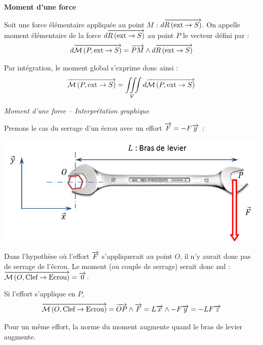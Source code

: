 \documentclass[10pt]{article}
\begin{document}
\begin{defi}
\textbf{Moment d'une force}

Soit une force élémentaire appliquée au point $M$ : $d\overrightarrow{R\left( {\text{ext}} \rightarrow {S}\right)}$. On appelle moment élémentaire de la force $d\overrightarrow{R\left( {\text{ext}} \rightarrow {S}\right)}$ au point $P$ le vecteur défini par : 
$$
d\overrightarrow{\mathcal{M}\left( {P}, {\text{ext}} \rightarrow {S}\right)} = \overrightarrow{PM}\wedge d\overrightarrow{R\left( {\text{ext}} \rightarrow {S}\right)}
$$

Par intégration, le moment global s'exprime donc ainsi : 
$$
\overrightarrow{\mathcal{M}\left( {P}, {\text{ext}} \rightarrow {S}\right)} = \iiint\limits_{\mathcal{V}}d\overrightarrow{\mathcal{M}\left( {P}, {\text{ext}} \rightarrow {S}\right)} 
$$


\end{defi}




\begin{rem}
\textit{Moment d'une force -- Interprétation graphique}

Prenons le cas du serrage d'un écrou avec un effort $\overrightarrow{F}=-F\overrightarrow{y}$ :

\begin{center}
\includegraphics[width=.6\textwidth]{images/clef}
\end{center}

Dans l'hypothèse où l'effort $\overrightarrow{F}$ s'appliquerait au point $O$, il n'y aurait donc pas de serrage de l'écrou. Le moment (ou couple de serrage) serait donc nul : $\overrightarrow{\mathcal{M}\left( {O}, {\text{Clef}} \rightarrow {\text{Ecrou}}\right)}=\overrightarrow{0}$.

Si l'effort s'applique en $P$, 
$$\overrightarrow{\mathcal{M}\left( {O}, {\text{Clef}} \rightarrow {\text{Ecrou}}\right)}=\overrightarrow{OP}\wedge\overrightarrow{F}
=L\overrightarrow{x}\wedge-F\overrightarrow{y}=-LF\overrightarrow{z}$$

Pour un même effort, la norme du moment augmente quand le bras de levier augmente.

\end{rem}
\end{document}
